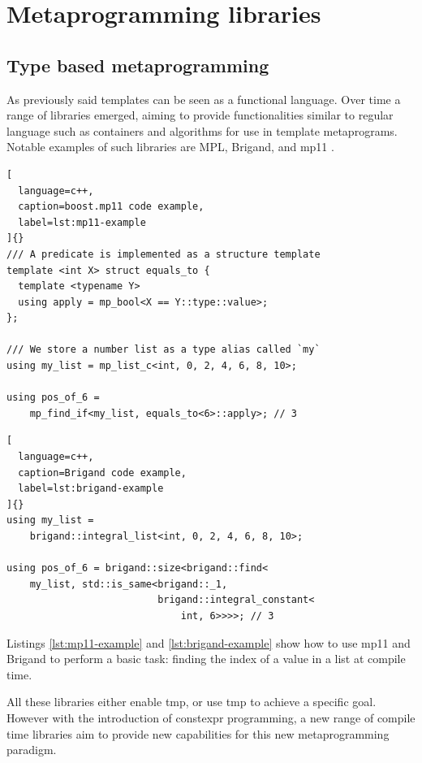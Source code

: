 \documentclass[../main]{subfiles}
\begin{document}
\section{
  Metaprogramming libraries
}
\label{lbl:meta-libraries}

\subsection{
  Type based metaprogramming
}


As previously said \cpp templates can be seen as a functional language.
Over time a range of libraries emerged, aiming to provide functionalities
similar to regular language such as containers and algorithms for use in
template metaprograms. Notable examples of such libraries are MPL\cite{mpl},
Brigand\cite{brigand}, and mp11 \cite{mp11}.

\begin{lstlisting}[
  language=c++,
  caption=boost.mp11 code example,
  label=lst:mp11-example
]{}
/// A predicate is implemented as a structure template
template <int X> struct equals_to {
  template <typename Y>
  using apply = mp_bool<X == Y::type::value>;
};

/// We store a number list as a type alias called `my`
using my_list = mp_list_c<int, 0, 2, 4, 6, 8, 10>;

using pos_of_6 =
    mp_find_if<my_list, equals_to<6>::apply>; // 3
\end{lstlisting}

\begin{lstlisting}[
  language=c++,
  caption=Brigand code example,
  label=lst:brigand-example
]{}
using my_list =
    brigand::integral_list<int, 0, 2, 4, 6, 8, 10>;

using pos_of_6 = brigand::size<brigand::find<
    my_list, std::is_same<brigand::_1,
                          brigand::integral_constant<
                              int, 6>>>>; // 3
\end{lstlisting}

Listings \ref{lst:mp11-example} and \ref{lst:brigand-example} show
how to use mp11 and Brigand to perform a basic task: finding the index of a
value in a list at compile time.

All these libraries either enable \gls{tmp}, or use \gls{tmp} to achieve
a specific goal. However with the introduction of \gls{constexpr} programming,
a new range of compile time libraries aim to provide new capabilities
for this new metaprogramming paradigm.
\end{document}
